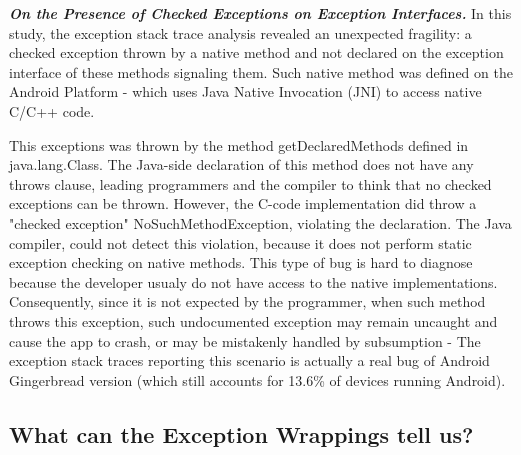 \documentclass[conference]{IEEEtran}
\begin{document}
\emph{\textbf{On the Presence of Checked Exceptions on Exception Interfaces.}} 
In this study, the exception stack trace analysis revealed an unexpected fragility: a 
checked exception thrown by a native method and not declared on the exception 
interface of these methods signaling them. Such native method was defined on
 the Android Platform -  which uses Java Native Invocation (JNI) to access 
native C/C++ code. 

This exceptions was thrown by the method getDeclaredMethods defined in java.lang.Class. 
The Java-side declaration of this method does not have any throws clause, 
leading programmers and the compiler to think that no checked exceptions can be thrown.
 However, the C-code implementation did throw a "checked exception" NoSuchMethodException, 
violating the declaration. The Java compiler, could not detect this violation, because it does 
not perform static exception checking on native methods. This type of bug is hard to diagnose
because the developer usualy do not have access to the native implementations. 
Consequently, since it is not expected by the programmer, when such method throws 
this exception, such undocumented exception may remain
uncaught and cause the app to crash, or may be mistakenly handled by subsumption - 
The exception stack traces reporting this scenario is actually a real bug of Android 
Gingerbread version (which still accounts for 13.6\% of devices running Android).

\noindent {}


\subsection{What can the Exception Wrappings tell us?}
\end{document}
